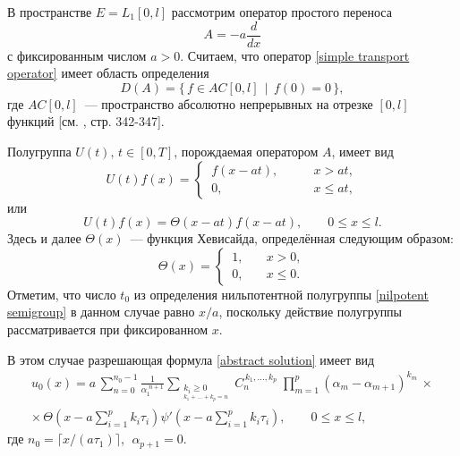 \documentclass{article}
\renewcommand{\le}{\leqslant}
\renewcommand{\ge}{\geqslant}
\theoremstyle{definition}
\begin{document}
В пространстве $E = L_1[0,l]$ рассмотрим оператор простого переноса
\begin{equation} \label{simple transport operator}
	A = -a\dfrac{d}{dx}
\end{equation}
с фиксированным числом $a > 0$. Считаем, что оператор \eqref{simple transport operator} имеет область определения
\begin{equation} \label{domain of simple transport operator}
	D(A) = \{\, f \in AC[0,l] \;\, | \;\, f(0) = 0 \,\},
\end{equation} 
где $AC[0,l]$~--- пространство абсолютно непрерывных на отрезке $[0,l]$ функций [см. \cite{Kolmogorov_Fomin}, стр. 342-347]. 

Полугруппа $U(t),\, t \in [0,T]$, порождаемая оператором $A$, имеет вид 
\begin{equation*}
U(t)f(x) = 
	\begin{cases}
		\,f(x - at), & \qquad x > at, \\
		\,0, 		 & \qquad x \le at,
	\end{cases}
\end{equation*}
или
\begin{equation*}
	U(t)f(x) = \Theta(x - at)f(x - at), \qquad 0 \le x \le l.
\end{equation*}
Здесь и далее $\Theta(x)$~--- функция Хевисайда, определённая следующим образом:
\begin{equation*}
\Theta(x) = 
	\begin{cases}
		\, 1, & \quad x > 0, \\
		\, 0, & \quad x \le 0.
	\end{cases}
\end{equation*} 
Отметим, что число $t_0$ из определения нильпотентной полугруппы \eqref{nilpotent semigroup} в данном случае равно $x/a$, поскольку действие полугруппы рассматривается при фиксированном $x$.

В этом случае разрешающая формула \eqref{abstract solution} имеет вид
\begin{equation} \label{homogenous solution}
\begin{gathered} 
	u_0(x) = a\,\sum\limits_{n = 0}^{n_0 - 1} \frac{1}{\alpha_1^{\,\,n + 1}}
	\sum\limits_{\substack{{k_i \ge 0} \\_{k_1 + ... + k_p = n}}}\!\!\!\!C_n^{\,k_1, ..., k_p}\;
	\prod_{m = 1}^{p}(\alpha_m - \alpha_{m + 1})^{k_m} \,\times \\[2mm] \times\,
	\Theta\!\left(x - a\sum\limits_{i = 1}^{p}k_i\tau_i \right)\psi'\!\left(x - a\sum\limits_{i = 1}^{p}k_i\tau_i\right), 
	\qquad 0 \le x \le l,
\end{gathered}
\end{equation}
где $n_0 = \lceil x / (a\tau_1) \rceil$, $\;\alpha_{p + 1} = 0$.
\end{document}
